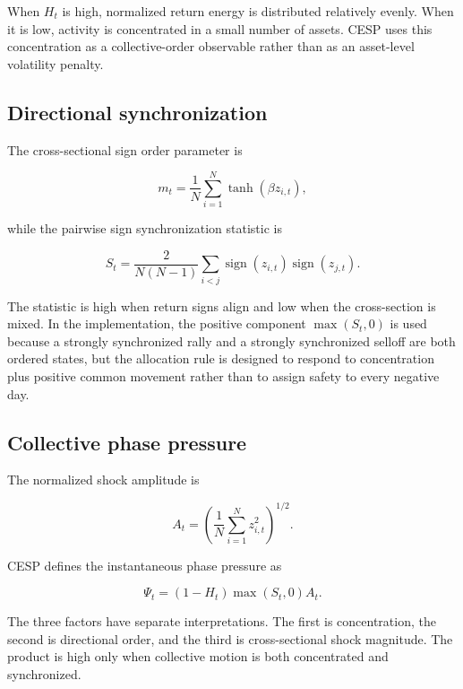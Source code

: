 \documentclass[11pt]{article}
\begin{document}
When $H_t$ is high, normalized return energy is distributed relatively evenly.
When it is low, activity is concentrated in a small number of assets. CESP uses
this concentration as a collective-order observable rather than as an asset-level
volatility penalty.

\subsection{Directional synchronization}

The cross-sectional sign order parameter is

\begin{equation}
m_t=
\frac{1}{N}\sum_{i=1}^{N}\tanh(\beta z_{i,t}),
\end{equation}

while the pairwise sign synchronization statistic is

\begin{equation}
S_t=
\frac{2}{N(N-1)}
\sum_{i<j}
\operatorname{sign}(z_{i,t})
\operatorname{sign}(z_{j,t}).
\end{equation}

The statistic is high when return signs align and low when the cross-section is
mixed. In the implementation, the positive component $\max(S_t,0)$ is used
because a strongly synchronized rally and a strongly synchronized selloff are
both ordered states, but the allocation rule is designed to respond to concentration
plus positive common movement rather than to assign safety to every negative day.

\subsection{Collective phase pressure}

The normalized shock amplitude is

\begin{equation}
A_t=
\left(
\frac{1}{N}\sum_{i=1}^{N}z_{i,t}^{2}
\right)^{1/2}.
\end{equation}

CESP defines the instantaneous phase pressure as

\begin{equation}
\Psi_t=(1-H_t)\max(S_t,0)A_t.
\end{equation}

The three factors have separate interpretations. The first is concentration,
the second is directional order, and the third is cross-sectional shock magnitude.
The product is high only when collective motion is both concentrated and synchronized.
\end{document}
